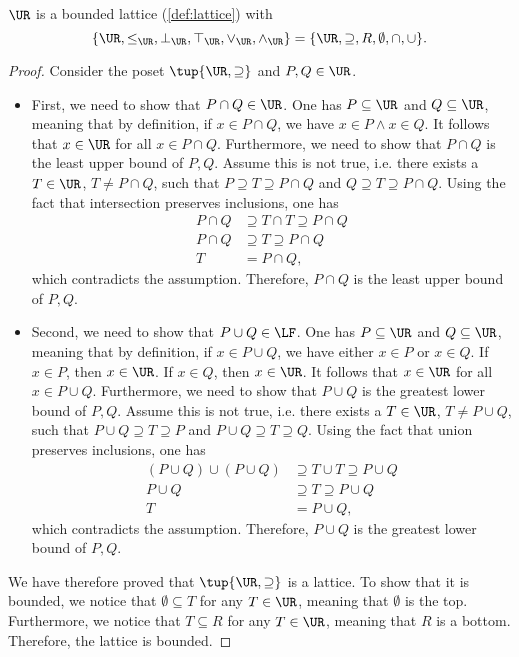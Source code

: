 \begin{lemma}
$\UR$ is a bounded lattice (\cref{def:lattice}) with
\begin{equation}
    \{\UR,\leq_{\UR},\bot_{\UR},\top_{\UR},\vee_{\UR},\wedge_{\UR}\}=\{\UR,\supseteq,R,\emptyset,\cap,\cup\}.
\end{equation}
\begin{proof}
Consider the poset $\tup{\UR,\supseteq}$ and $P,Q\in \UR$. 
\begin{itemize}
    \item First, we need to show that $P\cap Q\in \UR$. One has $P \subseteq \UR$ and $Q\subseteq \UR$, meaning that by definition, if $x\in P\cap Q$, we have $x\in P \wedge x\in Q$. It follows that $x\in \UR$ for all $x\in P\cap Q$. Furthermore, we need to show that $P\cap Q$ is the least upper bound of $P,Q$. Assume this is not true, i.e. there exists a $T\in \UR$, $T\neq P\cap Q$, such that $P\supseteq T\supseteq P\cap Q$ and $Q\supseteq T\supseteq P\cap Q$. Using the fact that intersection preserves inclusions, one has
\begin{equation}
\begin{aligned}
    P\cap Q &\supseteq T\cap T \supseteq P\cap Q\\
    P\cap Q &\supseteq T \supseteq P\cap Q\\
    T&= P\cap Q,
\end{aligned}
\end{equation}
which contradicts the assumption. Therefore, $P\cap Q$ is the least upper bound of $P,Q$.
\item Second, we need to show that $P\cup Q\in \LF$. One has $P\subseteq \UR$ and $Q\subseteq \UR$, meaning that by definition, if $x\in P\cup Q$, we have either $x\in P$ or $x\in Q$. If $x\in P$, then $x\in \UR$. If $x\in Q$, then $x\in \UR$. It follows that $x\in \UR$ for all $x\in P\cup Q$.  Furthermore, we need to show that $P\cup Q$ is the greatest lower bound of $P,Q$. Assume this is not true, i.e. there exists a $T\in \UR$, $T\neq P\cup Q$, such that $P\cup Q\supseteq T\supseteq P$ and $P\cup Q\supseteq T\supseteq Q$. Using the fact that union preserves inclusions, one has
\begin{equation}
    \begin{aligned}
    (P\cup Q)\cup (P\cup Q) &\supseteq T \cup T \supseteq P\cup Q\\
    P\cup Q &\supseteq T\supseteq P\cup Q\\
    T&=P\cup Q,
    \end{aligned}
\end{equation}
which contradicts the assumption.  Therefore, $P\cup Q$ is the greatest lower bound of $P,Q$.
\end{itemize}
We have therefore proved that $\tup{\UR,\supseteq}$ is a lattice. To show that it is bounded, we notice that $\emptyset \subseteq T$ for any $T\in \UR$, meaning that $\emptyset$ is the top. Furthermore, we notice that $T\subseteq R$ for any $T\in \UR$, meaning that $R$ is a bottom. Therefore, the lattice is bounded.
\end{proof}
\end{lemma}

